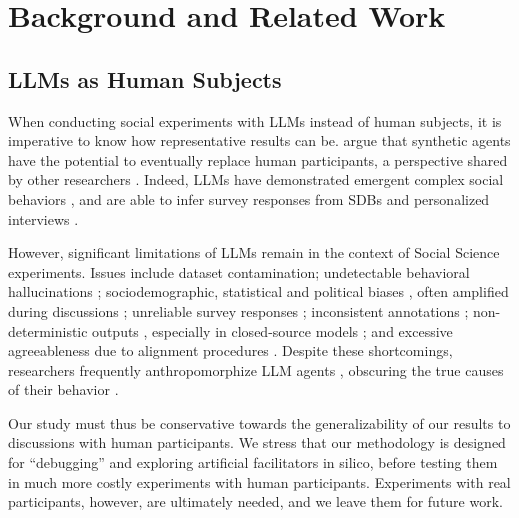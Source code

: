 %
\section{Background and Related Work}

\subsection{LLMs as Human Subjects}
\label{ssec:related:human-llm}

When conducting social experiments with \acp{LLM} instead of human subjects, it is imperative to know how representative results can be. \citet{grossman_2023} argue that synthetic agents have the potential to eventually replace human participants, a perspective shared by other researchers \cite{tornberg_2023, argyle2023}. Indeed, \acp{LLM} have demonstrated emergent complex social behaviors \cite{Park2023GenerativeAI, demarzo_2023, leng_2024, abdelnabi_negotiations, abramski_2023}, and are able to infer survey responses from \acp{SDB} \cite{hewitt2024predicting} and personalized interviews \cite{park2024generativeagentsimulations1000}.

However, significant limitations of \acp{LLM} remain in the context of Social Science experiments. Issues include dataset contamination; undetectable behavioral hallucinations \cite{rossi_2024}; sociodemographic, statistical and political biases \cite{anthis_2025,hewitt2024predicting,rossi_2024}, often amplified during discussions \cite{Taubenfeld2024SystematicBI}; unreliable survey responses \cite{jansen_2023,bisbee_2023,neumann_2025}; inconsistent annotations \cite{Gligoric2024CanUL}; non-deterministic outputs \cite{atil_2025}, especially in closed-source models \cite{bisbee_2023}; and excessive agreeableness due to alignment procedures \cite{Park2023GenerativeAI, anthis_2025, rossi_2024}. Despite these shortcomings, researchers frequently anthropomorphize \ac{LLM} agents \cite{rossi_2024}, obscuring the true causes of their behavior \cite{anthis_2025,zhou-etal-2024-real}. 

Our study must thus be conservative towards the generalizability of our results to discussions with human participants. We stress that our methodology is designed for “debugging” and exploring artificial facilitators in silico, before testing them in much more costly experiments with human participants. Experiments with real participants, however, are ultimately needed, and we leave them for future work.


